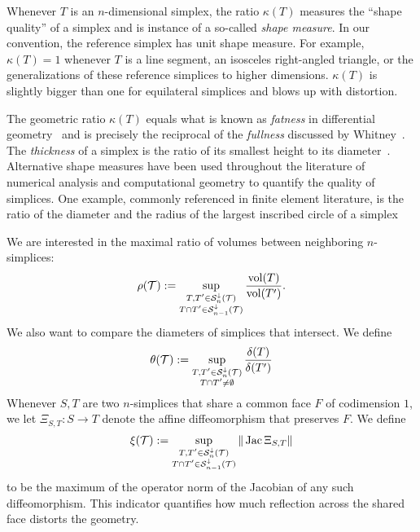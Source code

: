 \documentclass[10pt,letterpaper]{article}
\begin{document}
\begin{remark}
    Whenever $T$ is an $n$-dimensional simplex, the ratio $\kappa(T)$ measures the ``shape quality'' of a simplex and is instance of a so-called \emph{shape measure}.
    In our convention, the reference simplex has unit shape measure.
    For example, $\kappa(T)=1$ whenever $T$ is a line segment, an isosceles right-angled triangle, or the generalizations of these reference simplices to higher dimensions. $\kappa(T)$ is slightly bigger than one for equilateral simplices and blows up with distortion.

    The geometric ratio $\kappa(T)$ equals what is known as \emph{fatness} in differential geometry~\cite{cheeger1984curvature} and is precisely the reciprocal of the \emph{fullness} discussed by Whitney~\cite{whitney2012geometric}. 
    The \emph{thickness} of a simplex is the ratio of its smallest height to its diameter~\cite{munkres2016elementary}.
    Alternative shape measures have been used throughout the literature of numerical analysis and computational geometry to quantify the quality of simplices.
    One example, commonly referenced in finite element literature, is the ratio of the diameter and the radius of the largest inscribed circle of a simplex 
\end{remark}


We are interested in the maximal ratio of volumes between neighboring $n$-simplices: 
\begin{align}\label{math:volumecomparisonmeasure}
    \rho({\mathcal T}) := \sup_{ \substack{ T, T' \in {\mathcal S}^{\downarrow}_{n}({\mathcal T}) \\ T \cap T' \in {\mathcal S}^{\downarrow}_{n-1}({\mathcal T}) } } \frac{ \operatorname{vol}(T) }{ \operatorname{vol}(T') }.
\end{align}
We also want to compare the diameters of simplices that intersect. We define 
\begin{align}\label{math:diametercomparison}
    \theta({\mathcal T}) 
    := 
    \sup_{ \substack{ T, T' \in {\mathcal S}^{\downarrow}_{n}({\mathcal T}) \\ T \cap T' \neq \emptyset } }
    \frac{ {\delta}(T) }{ {\delta}(T') }
\end{align}
Whenever $S,T$ are two $n$-simplices that share a common face $F$ of codimension $1$, we let $\Xi_{S,T} : S \rightarrow T$ denote the affine diffeomorphism 
that preserves $F$. We define 
\begin{align}\label{math:reflectionmeasure}
    \xi({\mathcal T}) 
    := 
    \sup_{ \substack{ T, T' \in {\mathcal S}^{\downarrow}_{n}({\mathcal T}) \\ T \cap T' \in {\mathcal S}^{\downarrow}_{n-1}({\mathcal T}) } }
    \| \operatorname{{\rm Jac}} \Xi_{S,T} \|
\end{align}
to be the maximum of the operator norm of the Jacobian of any such diffeomorphism. 
This indicator quantifies how much reflection across the shared face distorts the geometry. 
\end{document}
